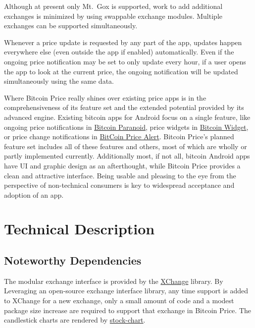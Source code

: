 \documentclass[twocolumn]{article}
\newcommand{\app}{Bitcoin Price\xspace}
\newcommand{\platform}{Android\xspace}
\newcommand{\onlyexch}{Mt.~Gox\xspace}
\begin{document}
    Although at present only \onlyexch is supported, work to add additional
    exchanges is minimized by using swappable exchange modules.  Multiple
    exchanges can be supported simultaneously.

    Whenever a price update is requested by any part of the app, updates happen
    everywhere else (even outside the app if enabled) automatically.  Even if
    the ongoing price notification may be set to only update every hour, if a
    user opens the app to look at the current price, the ongoing notification
    will be updated simultaneously using the same data.

    Where \app really shines over existing price apps is in the
    comprehensiveness of its feature set and the extended potential provided by
    its advanced engine.  Existing bitcoin apps for \platform focus on a single
    feature, like ongoing price notifications in
    \href{https://play.google.com/store/apps/details?id=br.eti.fml.satoshi}{Bitcoin
    Paranoid}, price widgets in
    \href{https://play.google.com/store/apps/details?id=st.brothas.mtgoxwidget}{Bitcoin
    Widget}, or price change notifications in
    \href{https://play.google.com/store/apps/details?id=com.mastah.bitcoinalert}{BitCoin
    Price Alert}.  \app's planned feature set includes all of these features
    and others, most of which are wholly or partly implemented currently.
    Additionally most, if not all, bitcoin \platform apps have UI and graphic
    design as an afterthought, while \app provides a clean and attractive
    interface.  Being usable and pleasing to the eye from the perspective of
    non-technical consumers is key to widespread acceptance and adoption of an
    app.

    \section*{Technical Description}

    \subsection*{Noteworthy Dependencies}

    The modular exchange interface is provided by the
    \href{https://github.com/timmolter/XChange}{XChange} library.  By
    Leveraging an open-source exchange interface library, any time support is
    added to XChange for a new exchange, only a small amount of code and a
    modest package size increase are required to support that exchange in \app.
    The candlestick charts are rendered by
    \href{https://code.google.com/p/stock-chart/}{stock-chart}.
\end{document}

